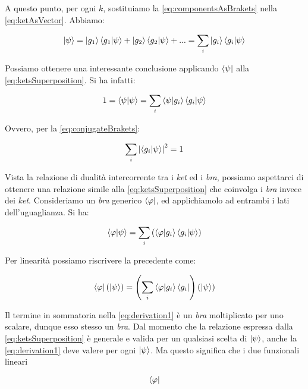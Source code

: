 A questo punto, per ogni $k$, sostituiamo la \eqref{eq:componentsAsBrakets} nella \eqref{eq:ketAsVector}. Abbiamo:

	\begin{equation} \label{eq:ketsSuperposition}
		\ket{\psi} = \ket{g_1} \braket{g_1}{\psi} + \ket{g_2} \braket{g_2}{\psi} + ... = \sum_i \ket{g_i} \braket{g_i}{\psi}
	\end{equation}

Possiamo ottenere una interessante conclusione applicando $\bra{\psi}$ alla \eqref{eq:ketsSuperposition}. Si ha infatti:

	\begin{equation}
		1 = \braket{\psi}{\psi} = \sum_i \braket{\psi}{g_i} \braket{g_i}{\psi}
	\end{equation}

Ovvero, per la \eqref{eq:conjugateBrakets}:

	\begin{equation} \label{eq:probabilitySum}
		\sum_i \left | \braket{g_i}{\psi} \right |^2 = 1
	\end{equation}

Vista la relazione di dualità intercorrente tra i \textit{ket} ed i \textit{bra}, possiamo aspettarci di ottenere una relazione simile alla \eqref{eq:ketsSuperposition} che coinvolga i \textit{bra} invece dei \textit{ket}. Consideriamo un \textit{bra} generico $\bra{\varphi}$, ed applichiamolo ad entrambi i lati dell'uguaglianza. Si ha:

	\begin{equation}
		\braket{\varphi}{\psi} = \sum_i \left( \braket{\varphi}{g_i} \braket{g_i}{\psi} \right)
	\end{equation}

Per linearità possiamo riscrivere la precedente come:

	\begin{equation} \label{eq:derivation1}
		\bra{\varphi}(\ket{\psi}) = \left( \sum_i \braket{\varphi}{g_i} \bra{g_i} \right) (\ket{\psi})
	\end{equation}

Il termine in sommatoria nella \eqref{eq:derivation1} \`e un \textit{bra} moltiplicato per uno scalare, dunque esso stesso un \textit{bra}. Dal momento che la relazione espressa dalla \eqref{eq:ketsSuperposition} \`e generale e valida per un qualsiasi scelta di $\ket{\psi}$, anche la \eqref{eq:derivation1} deve valere per ogni $\ket{\psi}$. Ma questo significa che i due funzionali lineari

	\[
		\bra{\varphi}
	\]

